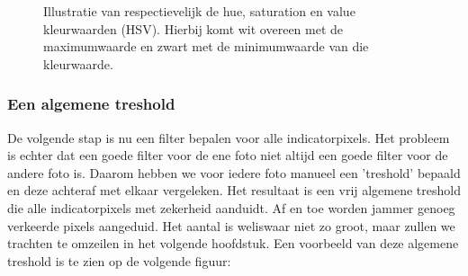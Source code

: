 \documentclass[a4paper,kulak]{kulakarticle}
\begin{document}
\begin{figure}[H]
	\centering
	\qquad
	\qquad
	
	\caption{Illustratie van respectievelijk de hue, saturation en value kleurwaarden (HSV). Hierbij komt wit overeen met de maximumwaarde en zwart met de minimumwaarde van die kleurwaarde.}
	\label{figuur HSV}
\end{figure}

\subsubsection{Een algemene treshold}
De volgende stap is nu een filter bepalen voor alle indicatorpixels. Het probleem is echter dat een goede filter voor de ene foto niet altijd een goede filter voor de andere foto is. Daarom hebben we voor iedere foto manueel een 'treshold' bepaald en deze achteraf met elkaar vergeleken. Het resultaat is een vrij algemene treshold die alle indicatorpixels met zekerheid aanduidt. Af en toe worden jammer genoeg verkeerde pixels aangeduid. Het aantal is weliswaar niet zo groot, maar zullen we trachten te omzeilen in het volgende hoofdstuk. Een voorbeeld van deze algemene treshold is te zien op de volgende figuur:
\end{document}
